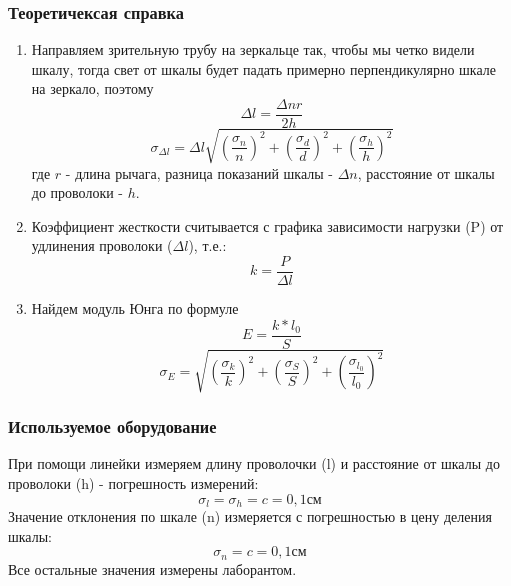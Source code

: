 \documentclass[a4paper,14pt]{extarticle}
\begin{document}
	\subsubsection{Теоретичексая справка}
	\begin{enumerate}
		\item Направляем зрительную трубу на зеркальце так, чтобы мы четко видели шкалу, тогда свет от шкалы будет падать примерно перпендикулярно шкале на зеркало, поэтому
		\[\Delta l =\dfrac{\Delta nr}{2h}\]
		\[ \sigma_{\Delta l} = \Delta l\sqrt{\left( \dfrac{\sigma_{n}}{n}\right)^2 + \left(\dfrac{\sigma_d}{d}\right)^2+\left(\dfrac{\sigma_h}{h}\right)^2} \]
		где $r$ - длина рычага, разница показаний шкалы - $\Delta n$, расстояние от шкалы до проволоки - $h$.  
		\item Коэффициент жесткости считывается с графика зависимости нагрузки (P) от удлинения проволоки ($\Delta l$), т.е.: $$k = \dfrac{P}{\Delta l}$$
		\item Найдем модуль Юнга по формуле
		\[E = \dfrac{k*l_0}{S}\]
		\[\sigma_E = \sqrt{\left( \dfrac{\sigma_{k}}{k} \right)^2 + \left( \dfrac{\sigma_{S}}{S} \right)^2 + \left( \dfrac{\sigma_{l_0}}{l_0} \right)^2 }\]
	\end{enumerate}
	\subsubsection{Используемое оборудование}
	При помощи линейки измеряем длину проволочки (l) и расстояние от шкалы до проволоки (h) - погрешность измерений: $$\sigma_l = \sigma_h = c = 0,1\text{см}$$
	Значение отклонения по шкале (n) измеряется с погрешностью в цену деления шкалы: $$\sigma_n = c = 0,1\text{см}$$ 
	Все остальные значения измерены лаборантом.
\end{document}
